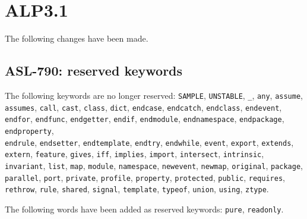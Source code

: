 \section{ALP3.1}

The following changes have been made.

\subsection{ASL-790: reserved keywords}
The following keywords are no longer reserved:
%
\texttt{SAMPLE},
\texttt{UNSTABLE},
\texttt{\_},
\texttt{any},
\texttt{assume},
\texttt{assumes},
\texttt{call},
\texttt{cast},
\texttt{class},
\texttt{dict},
\texttt{endcase},
\texttt{endcatch},
\texttt{endclass},
\texttt{endevent},
\texttt{endfor},
\texttt{endfunc},
\texttt{endgetter},
\texttt{endif},
\texttt{endmodule},
\texttt{endnamespace},
\texttt{endpackage},
\texttt{endproperty},\\
\texttt{endrule},
\texttt{endsetter},
\texttt{endtemplate},
\texttt{endtry},
\texttt{endwhile},
\texttt{event},
\texttt{export},
\texttt{extends},
\texttt{extern},
\texttt{feature},
\texttt{gives},
\texttt{iff},
\texttt{implies},
\texttt{import},
\texttt{intersect},
\texttt{intrinsic},
\texttt{invariant},
\texttt{list},
\texttt{map},
\texttt{module},
\texttt{namespace},
\texttt{newevent},
\texttt{newmap},
\texttt{original},
\texttt{package},
\texttt{parallel},
\texttt{port},
\texttt{private},
\texttt{profile},
\texttt{property},
\texttt{protected},
\texttt{public},
\texttt{requires},
\texttt{rethrow},
\texttt{rule},
\texttt{shared},
\texttt{signal},
\texttt{template},
\texttt{typeof},
\texttt{union},
\texttt{using},
\texttt{ztype}.

The following words have been added as reserved keywords:
\texttt{pure}, \texttt{readonly}.